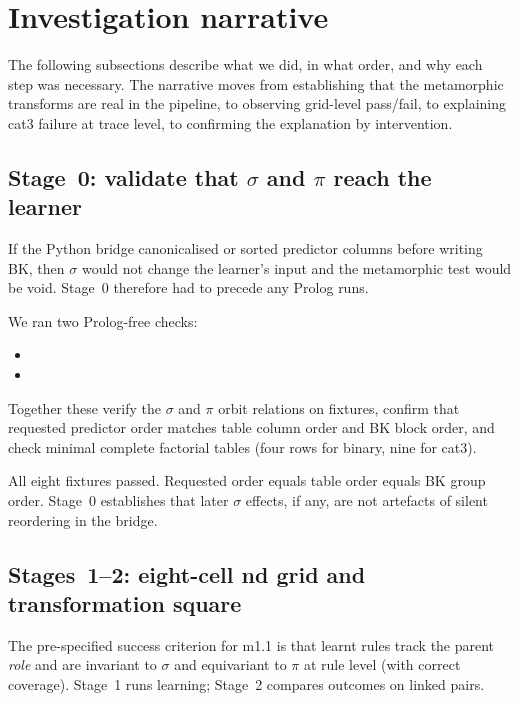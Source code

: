 \documentclass[11pt,a4paper]{article}
\begin{document}
\section{Investigation narrative}

The following subsections describe what we did, in what order, and why each step was necessary.
The narrative moves from establishing that the metamorphic transforms are real in the pipeline,
to observing grid-level pass/fail, to explaining cat3 failure at trace level, to confirming the
explanation by intervention.

\subsection[Stage 0: validate that sigma and pi reach the learner]{Stage~0: validate that $\sigma$ and $\pi$ reach the learner}
\label{sec:stage0}

If the Python bridge canonicalised or sorted predictor columns before writing BK, then $\sigma$
would not change the learner's input and the metamorphic test would be void. Stage~0 therefore
had to precede any Prolog runs.

We ran two Prolog-free checks:
\begin{itemize}
  \item {}
  \item {}
\end{itemize}
Together these verify the $\sigma$ and $\pi$ orbit relations on fixtures, confirm that requested
predictor order matches table column order and BK block order, and check minimal complete
factorial tables (four rows for binary, nine for cat3).

All eight fixtures passed. Requested order equals table order equals BK group order. Stage~0
establishes that later $\sigma$ effects, if any, are not artefacts of silent reordering in the
bridge.

\subsection{Stages~1--2: eight-cell nd grid and transformation square}
\label{sec:grid}

The pre-specified success criterion for m1.1 is that learnt rules track the parent \emph{role}
and are invariant to $\sigma$ and equivariant to $\pi$ at rule level (with correct coverage).
Stage~1 runs learning; Stage~2 compares outcomes on linked pairs.
\end{document}

